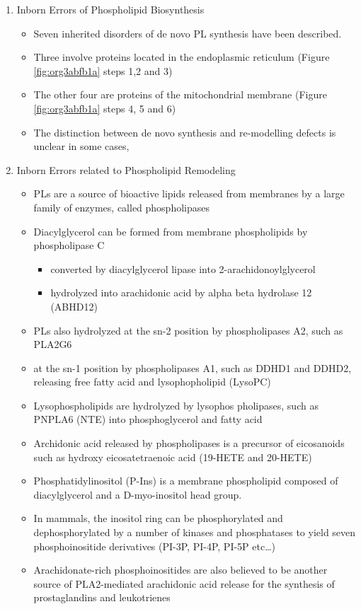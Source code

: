 \documentclass{scrartcl}
\begin{document}
\begin{enumerate}
\item Inborn Errors of Phospholipid Biosynthesis
\label{sec:org04ebe33}
\begin{itemize}
\item Seven inherited disorders of de novo PL synthesis have been described.
\item Three involve proteins located in the endoplasmic reticulum (Figure \ref{fig:org3abfb1a} steps 1,2 and 3)
\item The other four are proteins of the mitochondrial membrane (Figure \ref{fig:org3abfb1a} steps 4, 5 and 6)
\item The distinction between de novo synthesis and re-modelling defects is unclear in some cases,
\end{itemize}

\item Inborn Errors related to Phospholipid Remodeling
\label{sec:org6d677cf}
\begin{itemize}
\item PLs are a source of bioactive lipids released from
membranes by a large family of enzymes, called phospholipases
\item Diacylglycerol can be formed from membrane phospholipids by
phospholipase C
\begin{itemize}
\item converted by diacylglycerol lipase into 2-arachidonoylglycerol
\item hydrolyzed into arachidonic acid by alpha beta hydrolase 12 (ABHD12)
\end{itemize}
\item PLs also hydrolyzed at the sn-2 position by phospholipases A2, such
as PLA2G6
\item at the sn-1 position by phospholipases A1, such as DDHD1 and DDHD2,
releasing free fatty acid and lysophopholipid
(LysoPC)
\item Lysophospholipids are hydrolyzed by lysophos pholipases, such as
PNPLA6 (NTE) into phosphoglycerol and fatty acid
\item Archidonic acid released by phospholipases is a precursor of eicosanoids such as
hydroxy eicosatetraenoic acid (19-HETE and 20-HETE)
\item Phosphatidylinositol (P-Ins) is a membrane phospholipid composed of
diacylglycerol and a D-myo-inositol head group.
\item In mammals, the inositol ring can be phosphorylated and
dephosphorylated by a number of kinases and phosphatases to yield
seven phosphoinositide derivatives (PI-3P, PI-4P, PI-5P etc\ldots{})
\item Arachidonate-rich phosphoinositides are also believed to be another
source of PLA2-mediated arachidonic acid release for the synthesis
of prostaglandins and leukotrienes
\end{itemize}
\end{enumerate}
\end{document}
